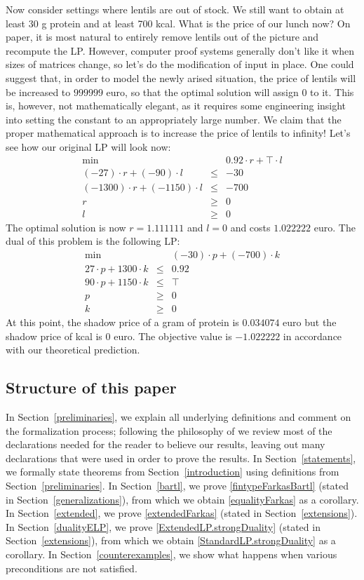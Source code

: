 \documentclass[]{article}
\renewcommand{\.}{\hskip .75pt}
\newcommand{\sekt}[1]{Section~\ref{#1}}
\begin{document}
Now consider settings where lentils are out of stock.
We still want to obtain at least 30 g protein and at least 700 kcal.
What is the price of our lunch now?
On paper, it is most natural to entirely remove lentils out of the picture
and recompute the LP.
However, computer proof systems generally don't like it when
sizes of matrices change, so let's do the modification of input in place.
One could suggest that, in order to model the newly arised situation,
the price of lentils will be increased to $999999$ euro,
so that the optimal solution will assign $0$ to it.
This is, however, not mathematically elegant, as it requires some
engineering insight into setting the constant to an appropriately large number.
We claim that the proper mathematical approach is to increase the
price of lentils to infinity! Let's see how our original LP will look now:
$$
\begin{array}{rcl}
\min && 0.92 \cdot r + \top \cdot l \\
(-27) \cdot r + (-90) \cdot l &\le& - 30 \\
(-1300) \cdot r + (-1150) \cdot l &\le& - 700 \\
r &\ge& 0  \\
l &\ge& 0 
\end{array}
$$
The optimal solution is now $r=1.111111$ and $l=0$ and costs $1.022222$ euro.
The dual of this problem is the following LP:
$$
\begin{array}{rcl}
\min && (-30) \cdot p + (-700) \cdot k \\
27 \cdot p + 1300 \cdot k &\le& 0.92 \\
 90 \cdot p + 1150 \cdot k &\le& \top \\
p &\ge& 0  \\
k &\ge& 0 
\end{array}
$$
At this point, the shadow price of a gram of protein is $0.034074$ euro but the shadow price of kcal is $0$ euro.
The objective value is $-1.022222$ in accordance with our theoretical prediction.

\subsection{Structure of this paper}

In \sekt{preliminaries}, we explain all underlying definitions and
comment on the formalization process;
following the philosophy of \cite{Believe}
we review most of the declarations needed for the reader to believe
our results, leaving out many declarations that were used in order
to prove the results.
In \sekt{statements}, we formally state theorems from \sekt{introduction}
using definitions from \sekt{preliminaries}.
In \sekt{bartl}, we prove \ref{fintypeFarkasBartl} (stated in \sekt{generalizations}),
from which we obtain \ref{equalityFarkas} as a corollary.
In \sekt{extended}, we prove \ref{extendedFarkas} (stated in \sekt{extensions}).
In \sekt{dualityELP}, we prove \ref{ExtendedLP.strongDuality}
(stated in \sekt{extensions}), from which we obtain
\ref{StandardLP.strongDuality} as a corollary.
In \sekt{counterexamples}, we show what happens when various preconditions
are not satisfied.
\end{document}
